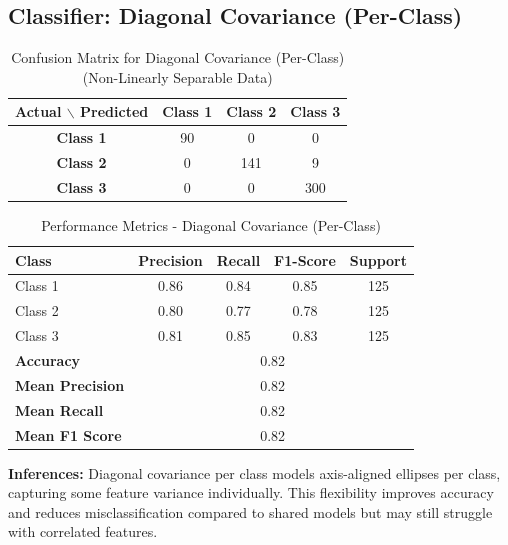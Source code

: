 \subsection{Classifier: Diagonal Covariance (Per-Class)}


\begin{table}[H]
\centering
\caption{Confusion Matrix for Diagonal Covariance (Per-Class) (Non-Linearly Separable Data)}
\label{tab:confmat_d3_sigma2I}
\begin{tabular}{|c|c|c|c|}
\hline
\textbf{Actual $\backslash$ Predicted} & \textbf{Class 1} & \textbf{Class 2} & \textbf{Class 3} \\
\hline
\textbf{Class 1} & 90   & 0   & 0   \\
\textbf{Class 2} & 0  & 141 & 9   \\
\textbf{Class 3} & 0   & 0   & 300 \\
\hline
\end{tabular}
\end{table}


\begin{table}[H]
\centering
\caption{Performance Metrics - Diagonal Covariance (Per-Class)}
\begin{tabular}{lcccc}
\toprule
\textbf{Class} & \textbf{Precision} & \textbf{Recall} & \textbf{F1-Score} & \textbf{Support} \\
\midrule
Class 1 & 0.86 & 0.84 & 0.85 & 125 \\
Class 2 & 0.80 & 0.77 & 0.78 & 125 \\
Class 3 & 0.81 & 0.85 & 0.83 & 125 \\
\midrule
\textbf{Accuracy} & \multicolumn{4}{c}{0.82} \\
\textbf{Mean Precision} & \multicolumn{4}{c}{0.82} \\
\textbf{Mean Recall} & \multicolumn{4}{c}{0.82} \\
\textbf{Mean F1 Score} & \multicolumn{4}{c}{0.82} \\
\bottomrule
\end{tabular}
\end{table}

\textbf{Inferences:}  
Diagonal covariance per class models axis-aligned ellipses per class, capturing some feature variance individually. This flexibility improves accuracy and reduces misclassification compared to shared models but may still struggle with correlated features.

